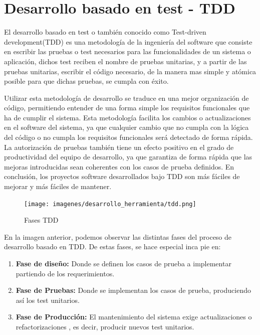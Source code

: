 \documentclass[a4paper,11pt]{book}
\begin{document}
\section{Desarrollo basado en test - TDD}\label{sec:TDD}

El desarrollo basado en test o también conocido como Test-driven development\cite{tdd}(TDD) es una metodología de la ingeniería del software que consiste en escribir las pruebas o test necesarios para las funcionalidades de un sistema o aplicación, dichos test reciben el nombre de pruebas unitarias, y a partir de las pruebas unitarias, escribir el código necesario, de la manera mas simple y atómica posible para que dichas pruebas, se cumpla con éxito.  


Utilizar esta metodología de desarrollo se traduce en una mejor organización de código, permitiendo entender de una forma simple los requisitos funcionales que ha de cumplir el sistema. Esta metodología facilita los cambios o actualizaciones en el software del sistema, ya que cualquier cambio que no cumpla con la lógica del código o no cumpla los requisitos funcionales será detectado de forma rápida. La autorización de pruebas también tiene un efecto positivo en el grado de productividad del equipo de desarrollo, ya que garantiza de forma rápida que las mejoras introducidas sean coherentes con los casos de prueba definidos. En conclusión, los proyectos software desarrollados bajo TDD son más fáciles de mejorar y más fáciles de mantener. 

\begin{figure}[H] 
\centering 
\texttt{[image: imagenes/desarrollo\_herramienta/tdd.png]}
\caption{ Fases TDD\cite{tdd2}  }  
\end{figure} 
	


En la imagen anterior, podemos observar las distintas fases del proceso de desarrollo basado en TDD. De estas fases, se hace especial inca pie en:

\begin{enumerate}
\item \textbf{Fase de diseño:} Donde se definen los casos de prueba a implementar partiendo de los requerimientos.

\item \textbf{Fase de Pruebas:} Donde se implementan los casos de prueba, produciendo así los test unitarios.

\item \textbf{Fase de Producción:} El mantenimiento del sistema exige actualizaciones o refactorizaciones , es decir, producir nuevos test unitarios. 
\end{enumerate}
\end{document}
